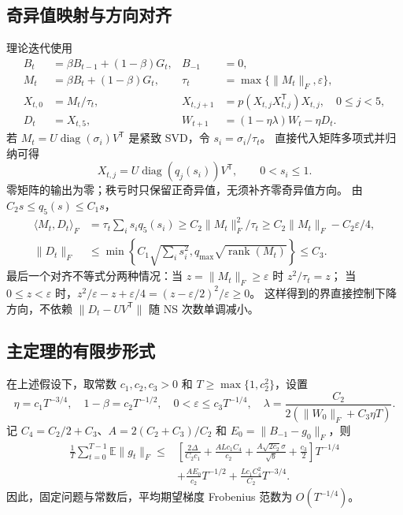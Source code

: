 \subsection{奇异值映射与方向对齐}
理论迭代使用
\begin{align}
 B_t&=\beta B_{t-1}+(1-\beta)G_t, & B_{-1}&=0,\\
 M_t&=\beta B_t+(1-\beta)G_t, &
 \tau_t&=\max\{\|M_t\|_F,\varepsilon\},\\
 X_{t,0}&=M_t/\tau_t,& X_{t,j+1}&=p(X_{t,j}X_{t,j}^{\mathsf T})X_{t,j},\quad 0\le j<5,\\
 D_t&=X_{t,5},& W_{t+1}&=(1-\eta\lambda)W_t-\eta D_t.
\end{align}
若 $M_t=U\operatorname{diag}(\sigma_i)V^{\mathsf T}$ 是紧致 SVD，令 $s_i=\sigma_i/\tau_t$。
直接代入矩阵多项式并归纳可得
\[
 X_{t,j}=U\operatorname{diag}(q_j(s_i))V^{\mathsf T},\qquad 0<s_i\le1.
\]
零矩阵的输出为零；秩亏时只保留正奇异值，无须补齐零奇异值方向。
由 $C_2s\le q_5(s)\le C_1s$，
\begin{align}
 \langle M_t,D_t\rangle_F
 &=\tau_t\sum_i s_iq_5(s_i)
 \ge C_2\|M_t\|_F^2/\tau_t
 \ge C_2\|M_t\|_F-C_2\varepsilon/4,\label{eq:alignment}\\
 \|D_t\|_F&\le\min\left\{C_1\sqrt{\sum_i s_i^2},q_{\max}\sqrt{\operatorname{rank}(M_t)}\right\}
 \le C_3.\label{eq:direction}
\end{align}
最后一个对齐不等式分两种情况：当 $z=\|M_t\|_F\ge\varepsilon$ 时 $z^2/\tau_t=z$；
当 $0\le z<\varepsilon$ 时，$z^2/\varepsilon-z+\varepsilon/4=(z-\varepsilon/2)^2/\varepsilon\ge0$。
这样得到的界直接控制下降方向，不依赖 $\|D_t-UV^{\mathsf T}\|$ 随 NS 次数单调减小。

\subsection{主定理的有限步形式}
\begin{theorem}\label{thm:main}
在上述假设下，取常数 $c_1,c_2,c_3>0$ 和 $T\ge\max\{1,c_2^2\}$，设置
\begin{equation}\label{eq:parameters}
 \eta=c_1T^{-3/4},\quad 1-\beta=c_2T^{-1/2},\quad
 0<\varepsilon\le c_3T^{-1/4},\quad
 \lambda=\frac{C_2}{2(\|W_0\|_F+C_3\eta T)}.
\end{equation}
记 $C_4=C_2/2+C_3$、$A=2(C_2+C_3)/C_2$ 和 $E_0=\|B_{-1}-g_0\|_F$，则
\begin{align}\label{eq:finite}
 \frac1T\sum_{t=0}^{T-1}\mathbb E\|g_t\|_F
 \le{}&\left[\frac{2\Delta}{C_2c_1}
 +\frac{ALc_1C_4}{c_2}
 +\frac{A\sqrt{2c_2}\sigma}{\sqrt b}+\frac{c_3}{2}\right]T^{-1/4}\nonumber\\
 &+\frac{AE_0}{c_2}T^{-1/2}
 +\frac{Lc_1C_4^2}{C_2}T^{-3/4}.
\end{align}
因此，固定问题与常数后，平均期望梯度 Frobenius 范数为 $O(T^{-1/4})$。
\end{theorem}

